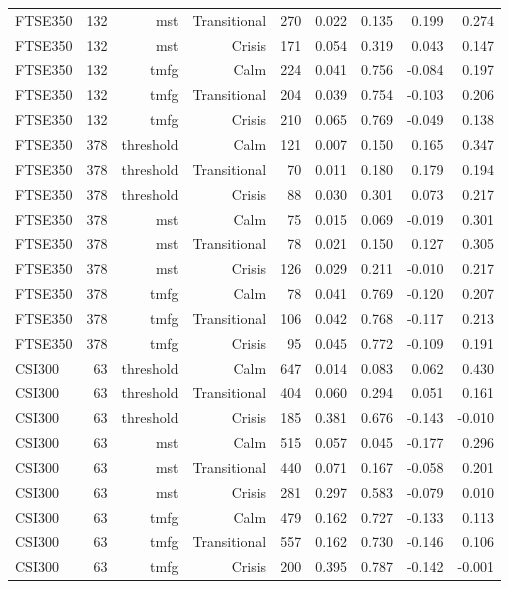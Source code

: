 \begin{tabular}{lrrrrrrrr}
FTSE350 & 132 & mst & Transitional & 270 & 0.022 & 0.135 & 0.199 & 0.274 \\
FTSE350 & 132 & mst & Crisis & 171 & 0.054 & 0.319 & 0.043 & 0.147 \\
FTSE350 & 132 & tmfg & Calm & 224 & 0.041 & 0.756 & -0.084 & 0.197 \\
FTSE350 & 132 & tmfg & Transitional & 204 & 0.039 & 0.754 & -0.103 & 0.206 \\
FTSE350 & 132 & tmfg & Crisis & 210 & 0.065 & 0.769 & -0.049 & 0.138 \\
FTSE350 & 378 & threshold & Calm & 121 & 0.007 & 0.150 & 0.165 & 0.347 \\
FTSE350 & 378 & threshold & Transitional & 70 & 0.011 & 0.180 & 0.179 & 0.194 \\
FTSE350 & 378 & threshold & Crisis & 88 & 0.030 & 0.301 & 0.073 & 0.217 \\
FTSE350 & 378 & mst & Calm & 75 & 0.015 & 0.069 & -0.019 & 0.301 \\
FTSE350 & 378 & mst & Transitional & 78 & 0.021 & 0.150 & 0.127 & 0.305 \\
FTSE350 & 378 & mst & Crisis & 126 & 0.029 & 0.211 & -0.010 & 0.217 \\
FTSE350 & 378 & tmfg & Calm & 78 & 0.041 & 0.769 & -0.120 & 0.207 \\
FTSE350 & 378 & tmfg & Transitional & 106 & 0.042 & 0.768 & -0.117 & 0.213 \\
FTSE350 & 378 & tmfg & Crisis & 95 & 0.045 & 0.772 & -0.109 & 0.191 \\
CSI300 & 63 & threshold & Calm & 647 & 0.014 & 0.083 & 0.062 & 0.430 \\
CSI300 & 63 & threshold & Transitional & 404 & 0.060 & 0.294 & 0.051 & 0.161 \\
CSI300 & 63 & threshold & Crisis & 185 & 0.381 & 0.676 & -0.143 & -0.010 \\
CSI300 & 63 & mst & Calm & 515 & 0.057 & 0.045 & -0.177 & 0.296 \\
CSI300 & 63 & mst & Transitional & 440 & 0.071 & 0.167 & -0.058 & 0.201 \\
CSI300 & 63 & mst & Crisis & 281 & 0.297 & 0.583 & -0.079 & 0.010 \\
CSI300 & 63 & tmfg & Calm & 479 & 0.162 & 0.727 & -0.133 & 0.113 \\
CSI300 & 63 & tmfg & Transitional & 557 & 0.162 & 0.730 & -0.146 & 0.106 \\
CSI300 & 63 & tmfg & Crisis & 200 & 0.395 & 0.787 & -0.142 & -0.001 \\

\end{tabular}
